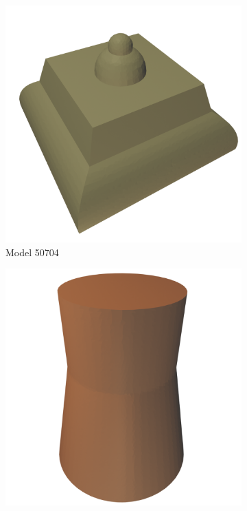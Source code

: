 \begin{figure}[htb]
\centering
\begin{subfigure}{0.3\textwidth}
	\includegraphics[width=\textwidth]{../resources/models/50704.png}
	\caption{Model 50704}
	\label{sfig:50704}
\end{subfigure}
\hfill
\begin{subfigure}{0.3\textwidth}
	\includegraphics[width=\textwidth]{../resources/models/229605.png}

\end{subfigure}
\end{figure}
